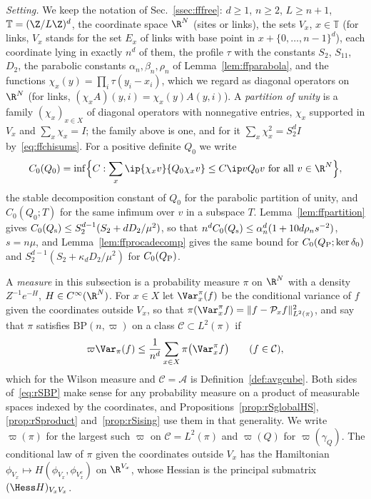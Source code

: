 \emph{Setting.} We keep the notation of Sec.~\ref{ssec:fffree}: $d\ge1$,
$n\ge2$, $L\ge n+1$, $\mathbb T=(\Z/L\Z)^d$, the coordinate space $\R^N$
(sites or links), the sets $V_x$, $x\in\mathbb T$ (for links, $V_x$ stands for
the set $E_x$ of links with base point in $x+\{0,\dots,n-1\}^d$), each
coordinate lying in exactly $n^d$ of them, the profile $\tau$ with the
constants $S_2$, $S_{11}$, $D_2$, the parabolic constants
$\alpha_n,\beta_n,\rho_n$ of Lemma~\ref{lem:ffparabola}, and the functions
$\chi_x(y)=\prod_i\tau(y_i-x_i)$, which we regard as diagonal operators on
$\R^N$ (for links, $(\chi_xA)(y,i)=\chi_x(y)A(y,i)$). A \emph{partition of
unity} is a family $(\chi_x)_{x\in X}$ of diagonal operators with nonnegative
entries, $\chi_x$ supported in $V_x$ and $\sum_x\chi_x=I$; the family above is
one, and for it $\sum_x\chi_x^2=S_2^dI$ by~\eqref{eq:ffchisums}. For a
positive definite $Q_0$ we write
\begin{equation}\label{eq:rSC0}
C_0(Q_0)=\inf\Bigl\{C:\sum_{x}\ip{\chi_xv}{Q_0\chi_xv}\le C\ip v{Q_0v}
\text{ for all }v\in\R^N\Bigr\},
\end{equation}
the stable decomposition constant of $Q_0$ for the parabolic partition of
unity, and $C_0(Q_0;T)$ for the same infimum over $v$ in a subspace $T$.
Lemma~\ref{lem:ffpartition} gives $C_0(Q_{\rm s})\le S_2^{d-1}(S_2+dD_2/\mu^2)$,
so that $n^dC_0(Q_{\rm s})\le\alpha_n^d(1+10d\rho_ns^{-2})$, $s=n\mu$, and
Lemma~\ref{lem:ffprocadecomp} gives the same bound for $C_0(Q_{\rm P};\ker
\delta_0)$ and $S_2^{d-1}(S_2+\kappa_dD_2/\mu^2)$ for $C_0(Q_{\rm P})$.

A \emph{measure} in this subsection is a probability measure $\pi$ on $\R^N$
with a density $Z^{-1}e^{-H}$, $H\in C^\infty(\R^N)$. For $x\in X$ let
$\Var^\pi_x(f)$ be the conditional variance of $f$ given the coordinates
outside $V_x$, so that $\pi(\Var^\pi_xf)=\lVert f-\mathcal P_xf\rVert^2_{L^2
(\pi)}$, and say that $\pi$ satisfies $\mathrm{BP}(n,\varpi)$ on a class
$\mathcal C\subset L^2(\pi)$ if
\begin{equation}\label{eq:rSBP}
\varpi\Var_\pi(f)\le\frac1{n^d}\sum_{x\in X}\pi\bigl(\Var^\pi_xf\bigr)
\qquad(f\in\mathcal C),
\end{equation}
which for the Wilson measure and $\mathcal C=\mathcal A$ is
Definition~\ref{def:avgcube}. Both sides of~\eqref{eq:rSBP} make sense for
any probability measure on a product of measurable spaces indexed by the
coordinates, and Propositions~\ref{prop:rSglobalHS}, \ref{prop:rSproduct}
and~\ref{prop:rSising} use them in that generality. We write $\varpi(\pi)$
for the largest such $\varpi$ on $\mathcal C=L^2(\pi)$ and $\varpi(Q)$ for
$\varpi(\gamma_Q)$. The conditional law of $\pi$ given the coordinates
outside $V_x$ has the Hamiltonian $\phi_{V_x}\mapsto H(\phi_{V_x},
\phi_{V_x^c})$ on $\R^{V_x}$, whose Hessian is the principal submatrix
$(\Hess H)_{V_xV_x}$.

